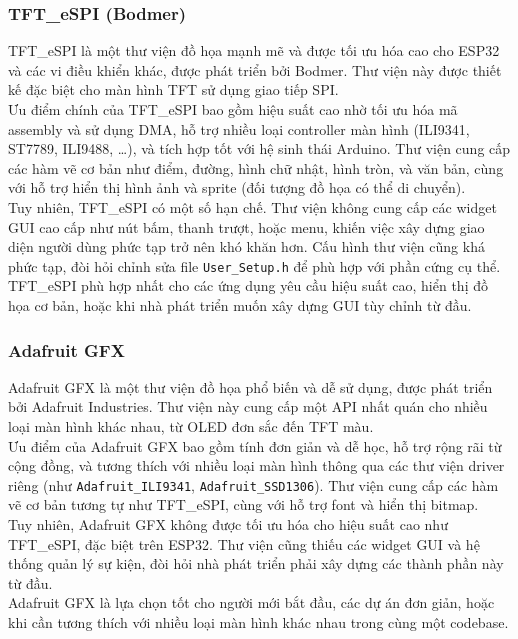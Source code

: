 \subsubsection{TFT\_eSPI (Bodmer)}
\tab TFT\_eSPI là một thư viện đồ họa mạnh mẽ và được tối ưu hóa cao cho ESP32 và các vi điều khiển khác, được phát triển bởi Bodmer. Thư viện này được thiết kế đặc biệt cho màn hình TFT sử dụng giao tiếp SPI.\\
\tab Ưu điểm chính của TFT\_eSPI bao gồm hiệu suất cao nhờ tối ưu hóa mã assembly và sử dụng DMA, hỗ trợ nhiều loại controller màn hình (ILI9341, ST7789, ILI9488, \ldots), và tích hợp tốt với hệ sinh thái Arduino. Thư viện cung cấp các hàm vẽ cơ bản như điểm, đường, hình chữ nhật, hình tròn, và văn bản, cùng với hỗ trợ hiển thị hình ảnh và sprite (đối tượng đồ họa có thể di chuyển).\\
\tab Tuy nhiên, TFT\_eSPI có một số hạn chế. Thư viện không cung cấp các widget GUI cao cấp như nút bấm, thanh trượt, hoặc menu, khiến việc xây dựng giao diện người dùng phức tạp trở nên khó khăn hơn. Cấu hình thư viện cũng khá phức tạp, đòi hỏi chỉnh sửa file \texttt{User\_Setup.h} để phù hợp với phần cứng cụ thể.\\
\tab TFT\_eSPI phù hợp nhất cho các ứng dụng yêu cầu hiệu suất cao, hiển thị đồ họa cơ bản, hoặc khi nhà phát triển muốn xây dựng GUI tùy chỉnh từ đầu.
\subsubsection{Adafruit GFX}
\tab Adafruit GFX là một thư viện đồ họa phổ biến và dễ sử dụng, được phát triển bởi Adafruit Industries. Thư viện này cung cấp một API nhất quán cho nhiều loại màn hình khác nhau, từ OLED đơn sắc đến TFT màu.\\
\tab Ưu điểm của Adafruit GFX bao gồm tính đơn giản và dễ học, hỗ trợ rộng rãi từ cộng đồng, và tương thích với nhiều loại màn hình thông qua các thư viện driver riêng (như \texttt{Adafruit\_ILI9341}, \texttt{Adafruit\_SSD1306}). Thư viện cung cấp các hàm vẽ cơ bản tương tự như TFT\_eSPI, cùng với hỗ trợ font và hiển thị bitmap.\\
\tab Tuy nhiên, Adafruit GFX không được tối ưu hóa cho hiệu suất cao như TFT\_eSPI, đặc biệt trên ESP32. Thư viện cũng thiếu các widget GUI và hệ thống quản lý sự kiện, đòi hỏi nhà phát triển phải xây dựng các thành phần này từ đầu.\\
\tab Adafruit GFX là lựa chọn tốt cho người mới bắt đầu, các dự án đơn giản, hoặc khi cần tương thích với nhiều loại màn hình khác nhau trong cùng một codebase.
